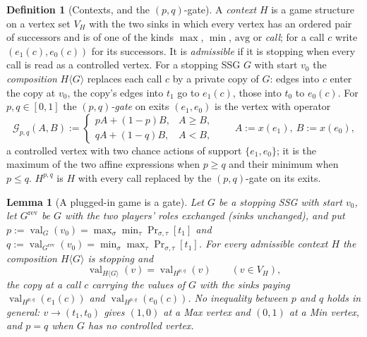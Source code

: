\documentclass[11pt]{article}
\theoremstyle{plain}
\newtheorem{lemma}[theorem]{Lemma}
\theoremstyle{definition}
\newtheorem{definition}[theorem]{Definition}
\DeclareMathOperator{\val}{val}
\begin{document}
\begin{definition}[Contexts, and the $(p,q)$-gate]\label{def:gate}
A \emph{context} $H$ is a game structure on a vertex set $V_H$ with the
two sinks in which every vertex has an ordered pair of successors and is
of one of the kinds $\max$, $\min$, $\mathrm{avg}$ or \emph{call}; for a
call $c$ write $(e_1(c),e_0(c))$ for its successors. It is
\emph{admissible} if it is stopping when every call is read as a
controlled vertex. For a stopping SSG $G$ with start $v_0$ the
\emph{composition} $H\langle G\rangle$ replaces each call $c$ by a
private copy of $G$: edges into $c$ enter the copy at $v_0$, the copy's
edges into $t_1$ go to $e_1(c)$, those into $t_0$ to $e_0(c)$. For
$p,q\in[0,1]$ the \emph{$(p,q)$-gate} on exits $(e_1,e_0)$ is the vertex
with operator
\[
  \mathcal G_{p,q}(A,B):=\begin{cases}pA+(1-p)B,&A\ge B,\\ qA+(1-q)B,&A<B,\end{cases}
  \qquad A:=x(e_1),\ B:=x(e_0),
\]
a controlled vertex with two chance actions of support $\{e_1,e_0\}$; it
is the maximum of the two affine expressions when $p\ge q$ and their
minimum when $p\le q$. $H^{p,q}$ is $H$ with every call replaced by the
$(p,q)$-gate on its exits.
\end{definition}

\begin{lemma}[A plugged-in game is a gate]\label{lem:gate}
Let $G$ be a stopping SSG with start $v_0$, let $G^{\mathrm{rev}}$ be $G$
with the two players' roles exchanged (sinks unchanged), and put
$p:=\val_G(v_0)=\max_\sigma\min_\tau\Pr_{\sigma,\tau}[t_1]$ and
$q:=\val_{G^{\mathrm{rev}}}(v_0)=\min_\sigma\max_\tau\Pr_{\sigma,\tau}[t_1]$.
For every admissible context $H$ the composition $H\langle G\rangle$ is
stopping and
\[
  \val_{H\langle G\rangle}(v)=\val_{H^{p,q}}(v)\qquad(v\in V_H),
\]
the copy at a call $c$ carrying the values of $G$ with the sinks paying
$\val_{H^{p,q}}(e_1(c))$ and $\val_{H^{p,q}}(e_0(c))$. No inequality
between $p$ and $q$ holds in general: $v\to(t_1,t_0)$ gives $(1,0)$ at a
Max vertex and $(0,1)$ at a Min vertex, and $p=q$ when $G$ has no
controlled vertex.
\end{lemma}
\end{document}
